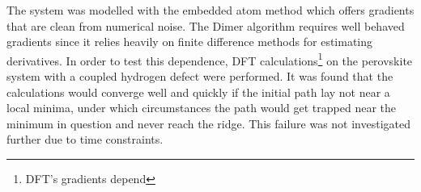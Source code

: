 The  system was modelled with the embedded atom method which offers gradients that are clean from numerical noise.
The Dimer algorithm requires well behaved gradients since it relies heavily on finite difference methods for estimating derivatives.
In order to test this dependence, DFT calculations\footnote{DFT's gradients depend \expand} on the  perovskite system with a coupled hydrogen defect were performed.
\expand
It was found that the calculations would converge well and quickly if the initial path lay not near a local minima, under which circumstances the path would get trapped near the minimum in question and never reach the ridge.
This failure was not investigated further due to time constraints.





